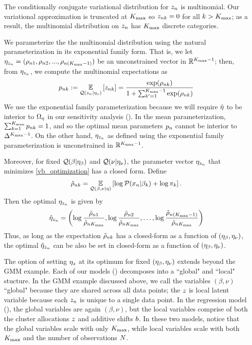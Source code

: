 \begin{ex}
%
The conditionally conjugate variational distribution for $z_n$
is multinomial.
Our variational approximation is truncated at ${K_{\mathrm{max}}}$ so
$z_{nk} = 0$ for all $k > {K_{\mathrm{max}}}$;
as a result,
the multinomial distribution on $z_n$ has ${K_{\mathrm{max}}}$ discrete categories.


We parameterize the the multinomial distribution using the natural parameterization
in its exponential family form. That is,
we let $\eta_{z_n} = (\rho_{n1}, \rho_{n2}, ..., \rho_{n({K_{\mathrm{max}}}-1)})$
be an unconstrained vector in $\mathbb{R}^{{K_{\mathrm{max}}}-1}$;
then, from $\eta_{z_n}$, we compute the multinomial expectations as
%
\begin{align*}
  p_{nk} := \underset{\mathcal{Q}(z_n \vert \eta_{z})}{\mathbb{E}}\left[z_{nk}\right] =
  \frac{\exp(\rho_{nk})}{1 + \sum_{k'=1}^{{K_{\mathrm{max}}}-1}\exp(\rho_{nk})}
\end{align*}
%
We use the exponential family parameterization because
we will require $\hat\eta$ to be interior to $\Omega_{\eta}$ in our sensitivity analysis
().
In the mean parameterization,
$\sum_{k=1}^{K_{\mathrm{max}}} p_{nk} = 1$, and so the
optimal mean parameters $p_{n}$ cannot be
interior to $\Delta^{{K_{\mathrm{max}}} - 1}$.
On the other hand, $\eta_{z_n}$ as defined using the
exponential family parameterization is unconstrained in $\mathbb{R}^{{K_{\mathrm{max}}} - 1}$.

Moreover, for fixed $\mathcal{Q}(\beta\vert\eta_{\beta})$ and $\mathcal{Q}(\nu\vert\eta_{\nu})$,
the parameter vector $\eta_{z_n}$ that minimizes \eqref{vb_optimization}
has a closed form. Define
%
\begin{align*}
\tilde \rho_{nk} = \underset{\mathcal{Q}(\beta, \nu \vert \eta)}{\mathbb{E}}\left[\log \mathcal{P}(x_n \vert \beta_k) + \log \pi_k\right].
\end{align*}
%
Then the optimal $\eta_{z_n}$ is given by
%
\begin{align*}
%
\etaopt_{\z_\n} = \left(\log\frac{\tilde\rho_{\n1}}{\tilde\rho_{\n\kmax}},
\log\frac{\tilde\rho_{\n2}}{\tilde\rho_{\n\kmax}}, \ldots,
\log\frac{\tilde\rho_{\n(\kmax-1)}}{\tilde\rho_{\n\kmax}}\right)
%
\end{align*}
%
Thus, as long as the expectation $\tilde\rho_{nk}$ has a closed-form as a function of
$(\eta_{\beta}, \eta_{\nu})$, the optimal $\hat\eta_{z_n}$ can be also be set in closed-form as
a function of $(\eta_{\beta}, \eta_{\nu})$.
%
\end{ex}

The option of setting $\eta_{z}$ at its optimum for fixed $(\eta_{\beta}, \eta_{\nu})$
extends beyond the GMM example.
Each of our models
()
decomposes into a ``global" and ``local" stucture.
In the GMM example discussed above, we call the variables $(\beta, \nu)$ ``global"
because they are shared across all data points; the $z$ is local latent variable
because each $z_n$ is unique to a single data point.
In the regression model (),
the global variables are again $(\beta, \nu)$,
but the local variables comprise of both the cluster allocations $z$ and additive shifts $b$.
In these two models, notice that the global variables scale with only ${K_{\mathrm{max}}}$, while
local variables scale with both ${K_{\mathrm{max}}}$ and the number of observations $N$.

